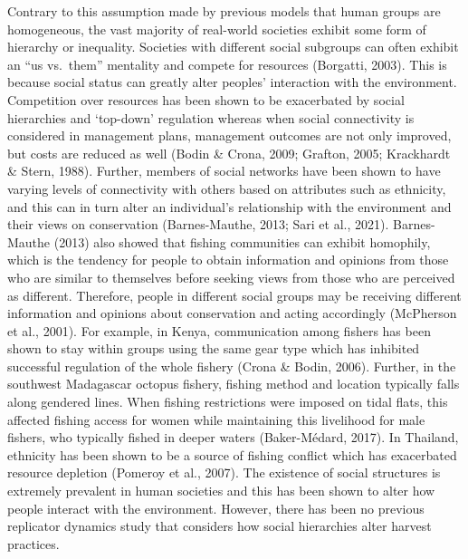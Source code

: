 \documentclass[
]{article}
\begin{document}
Contrary to this assumption made by previous models that human groups are homogeneous, the vast majority of real-world societies exhibit some form of hierarchy or inequality. Societies with different social subgroups can often exhibit an ``us vs.~them'' mentality and compete for resources (Borgatti, 2003). This is because social status can greatly alter peoples' interaction with the environment. Competition over resources has been shown to be exacerbated by social hierarchies and `top-down' regulation whereas when social connectivity is considered in management plans, management outcomes are not only improved, but costs are reduced as well (Bodin \& Crona, 2009; Grafton, 2005; Krackhardt \& Stern, 1988). Further, members of social networks have been shown to have varying levels of connectivity with others based on attributes such as ethnicity, and this can in turn alter an individual's relationship with the environment and their views on conservation (Barnes-Mauthe, 2013; Sari et al., 2021). Barnes-Mauthe (2013) also showed that fishing communities can exhibit homophily, which is the tendency for people to obtain information and opinions from those who are similar to themselves before seeking views from those who are perceived as different. Therefore, people in different social groups may be receiving different information and opinions about conservation and acting accordingly (McPherson et al., 2001). For example, in Kenya, communication among fishers has been shown to stay within groups using the same gear type which has inhibited successful regulation of the whole fishery (Crona \& Bodin, 2006). Further, in the southwest Madagascar octopus fishery, fishing method and location typically falls along gendered lines. When fishing restrictions were imposed on tidal flats, this affected fishing access for women while maintaining this livelihood for male fishers, who typically fished in deeper waters (Baker-Médard, 2017). In Thailand, ethnicity has been shown to be a source of fishing conflict which has exacerbated resource depletion (Pomeroy et al., 2007). The existence of social structures is extremely prevalent in human societies and this has been shown to alter how people interact with the environment. However, there has been no previous replicator dynamics study that considers how social hierarchies alter harvest practices.
\end{document}

